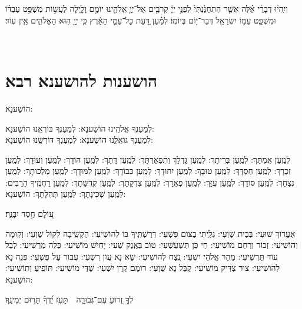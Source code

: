 \documentclass[twoside, openany, parskip=half, 11pt]{book}
\begin{document}
 וְיִֽהְי֨וּ  דְבָרַ֜י אֵ֗לֶּה אֲשֶׁ֤ר הִתְחַנַּ֙נְתִּי֙ לִפְנֵ֣י יְיָ֔ קְרֹבִ֛ים אֶל־יְיָ֥ אֱלֹהֵ֖ינוּ יוֹמָ֣ם וָלָ֑יְלָה לַעֲשׂ֣וֹת מִשְׁפַּ֣ט עַבְדּ֗וֹ וּמִשְׁפַּ֛ט עַמּ֥וֹ יִשְׂרָאֵ֖ל דְּבַר־י֥וֹם בְּיוֹמֽוֹ׃  לְמַ֗עַן דַּ֚עַת כׇּל־עַמֵּ֣י הָאָ֔רֶץ כִּ֥י יְיָ֖ ה֣וּא הָאֱלֹהִ֑ים אֵ֖ין עֽוֹד׃

 \vfill
{} \pageref{einkelokeinu}\\
 \pageref{end of shacharis}

\clearpage

\vspace{-1\baselineskip}
\section[הושענות להושענא רבא]{ הושענות להושענא רבא }

\begin{Large}
 הוֹשַׁענָא:
 \end{Large}
 
  
  לְמַעַנְךָ אֱלֹהֵֽינוּ הוֹשַׁענָא: לְמַעַנְךָ בּוֹרְאֵֽנוּ הוֹשַׁענָא:\\
לְמַעַנְךָ גּוֹאֲלֵֽנוּ הוֹשַׁענָא: לְמַעַנְךָ דּוֹרְשֵֽׁנוּ הוֹשַׁענָא:

לְמַֽעַן אֲמִתָּךְ: לְמַֽעַן בְּרִיתָךְ: לְמַֽעַן גָּדְלָךְ וְתִפְאַרְתָּךְ: לְמַֽעַן דָּתָךְ: לְמַֽעַן הוֹדָךְ: לְמַֽעַן וִעוּדָךְ: לְמַֽעַן זִכְרָךְ: לְמַֽעַן חַסְדָּךְ: לְמַֽעַן טוּבָךְ: לְמַֽעַן יִחוּדָךְ: לְמַֽעַן כְּבוֹדָךְ: לְמַֽעַן לִמּוּדָךְ: לְמַֽעַן מַלְכוּתָךְ: לְמַֽעַן נִצְחָךְ: לְמַֽעַן סוֹדָךְ: לְמַֽעַן עֻזָּךְ: לְמַֽעַן פְּאֵרָךְ: לְמַֽעַן צִדְקָתָךְ: לְמַֽעַן קְדֻשָּׁתָךְ: לְמַֽעַן רַחֲמֶֽיךָ הָרַבִּים:
לְמַֽעַן שְׁכִינָתָךְ:
 לְמַֽעַן תְּהִלָּתָךְ: הוֹשַׁענָא:

ע֭וֹלָם חֶ֣סֶד יִבָּנֶ֑ה׃

אֶעֱרוֹךְ שׁוּעִי: בְּבֵית שַׁוְעִי: גִּלִּֽיתִי בַצּוֹם פִּשְׁעִי: דְּרַשְׁתִּֽיךָ בּוֹ לְהוֹשִׁיעִי: הַקְשִֽׁיבָה לְקוֹל שַׁוְעִי: וְקֽוּמָה וְהוֹשִׁיעִי: זְכוֹר וְרַחֵם מוֹשִׁיעִי: חַי כֵּן תְּשַׁעְשְׁעִי: טוֹב בְּאֶֽנֶק שְׁעִי: יָחִישׁ מוֹשִׁיעִי: כַּלֵּה מַרְשִׁיעִי: לְבַל עוֹד תַּרְשִׁיעִי: מַהֵר אֱלֹהֵי יִשְׁעִי: נֶֽצַח לְהוֹשִׁיעִי: שָׂא נָא עֲוֹן רִשְׁעִי: עֲבוֹר עַל פִּשְׁעִי: פְּנֵה נָא לְהוֹשִׁיעִי: צוּר צַדִּיק מוֹשִׁיעִי: קַבֵּל נָא שַׁוְעִי: רוֹמֵם קֶֽרֶן יִשְׁעִי:
שַׁדַּי מוֹשִׁיעִי: 
תּוֹפִֽיעַ וְתוֹשִׁיעִי: הוֹשַׁענָא:

 לְךָ֣  זְ֭רוֹעַ עִם־גְּבוּרָ֑ה תָּעֹ֥ז יָ֝דְךָ֗ תָּר֥וּם יְמִינֶֽךָ׃
\end{document}
